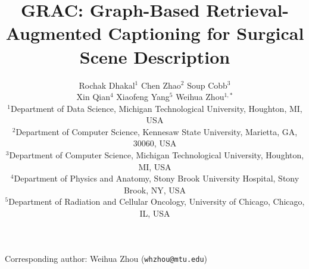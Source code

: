 \documentclass[11pt]{article}
\begin{document}
\title{GRAC: Graph-Based Retrieval-Augmented Captioning for Surgical Scene Description}

\author{
Rochak Dhakal$^{1}$ \quad Chen Zhao$^{2}$ \quad Soup Cobb$^{3}$ \\[2pt]
Xin Qian$^{4}$ \quad Xiaofeng Yang$^{5}$ \quad Weihua Zhou$^{1,*}$ \\[6pt]
\small $^{1}$Department of Data Science, Michigan Technological University, Houghton, MI, USA \\
\small $^{2}$Department of Computer Science, Kennesaw State University, Marietta, GA, 30060, USA \\
\small $^{3}$Department of Computer Science, Michigan Technological University, Houghton, MI, USA \\
\small $^{4}$Department of Physics and Anatomy, Stony Brook University Hospital, Stony Brook, NY, USA \\
\small $^{5}$Department of Radiation and Cellular Oncology, University of Chicago, Chicago, IL, USA \\[6pt]
}

\date{}

\maketitle

\begin{center}
\small Corresponding author: Weihua Zhou
(\texttt{whzhou@mtu.edu})
\end{center}
\end{document}
